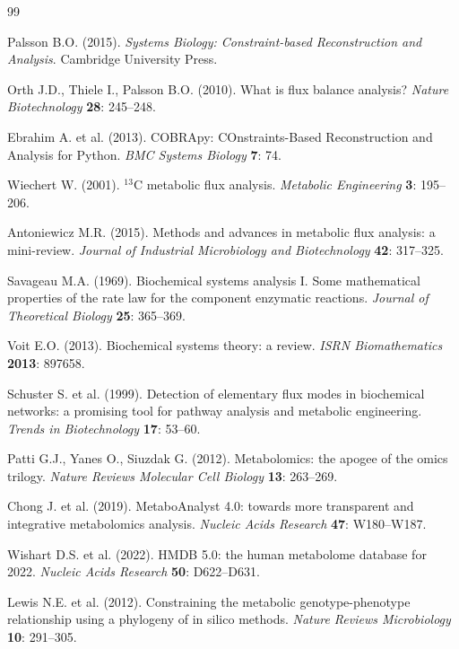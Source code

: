 \begin{thebibliography}{99}

Palsson B.O. (2015).
\textit{Systems Biology: Constraint-based Reconstruction and Analysis}.
Cambridge University Press.

Orth J.D., Thiele I., Palsson B.O. (2010).
What is flux balance analysis?
\textit{Nature Biotechnology} \textbf{28}: 245--248.

Ebrahim A. et al. (2013).
COBRApy: COnstraints-Based Reconstruction and Analysis for Python.
\textit{BMC Systems Biology} \textbf{7}: 74.

Wiechert W. (2001).
$^{13}$C metabolic flux analysis.
\textit{Metabolic Engineering} \textbf{3}: 195--206.

Antoniewicz M.R. (2015).
Methods and advances in metabolic flux analysis: a mini-review.
\textit{Journal of Industrial Microbiology and Biotechnology} \textbf{42}: 317--325.

Savageau M.A. (1969).
Biochemical systems analysis I. Some mathematical properties of the rate law for
the component enzymatic reactions.
\textit{Journal of Theoretical Biology} \textbf{25}: 365--369.

Voit E.O. (2013).
Biochemical systems theory: a review.
\textit{ISRN Biomathematics} \textbf{2013}: 897658.

Schuster S. et al. (1999).
Detection of elementary flux modes in biochemical networks: a promising tool
for pathway analysis and metabolic engineering.
\textit{Trends in Biotechnology} \textbf{17}: 53--60.

Patti G.J., Yanes O., Siuzdak G. (2012).
Metabolomics: the apogee of the omics trilogy.
\textit{Nature Reviews Molecular Cell Biology} \textbf{13}: 263--269.

Chong J. et al. (2019).
MetaboAnalyst 4.0: towards more transparent and integrative metabolomics analysis.
\textit{Nucleic Acids Research} \textbf{47}: W180--W187.

Wishart D.S. et al. (2022).
HMDB 5.0: the human metabolome database for 2022.
\textit{Nucleic Acids Research} \textbf{50}: D622--D631.

Lewis N.E. et al. (2012).
Constraining the metabolic genotype-phenotype relationship using a phylogeny of
in silico methods.
\textit{Nature Reviews Microbiology} \textbf{10}: 291--305.

\end{thebibliography}
